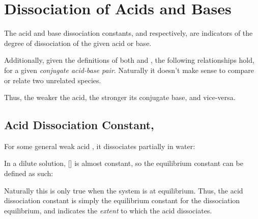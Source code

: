 



	\pagebreak
	\section{Dissociation of Acids and Bases}

		The acid and base dissociation constants, \Ka{} and \Kb{} respectively, are indicators of the degree of dissociation of the given acid
		or base.

		Additionally, given the definitions of both \Ka{} and \Kb{}, the following relationships hold, for a given
		\textit{conjugate acid-base pair}. Naturally it doesn't make sense to compare or relate two unrelated species.


		Thus, the weaker the acid, the stronger its conjugate base, and vice-versa.


		\subsection{Acid Dissociation Constant, \MKa{}}

			For some general weak acid , it dissociates partially in water:


			In a dilute solution, [] is almost constant, so the equilibrium constant can be defined as such:


			Naturally this is only true when the system is at equilibrium. Thus, the acid dissociation constant \Ka{} is simply the
			equilibrium constant for the dissociation equilibrium, and indicates the \textit{extent} to which the acid dissociates.

